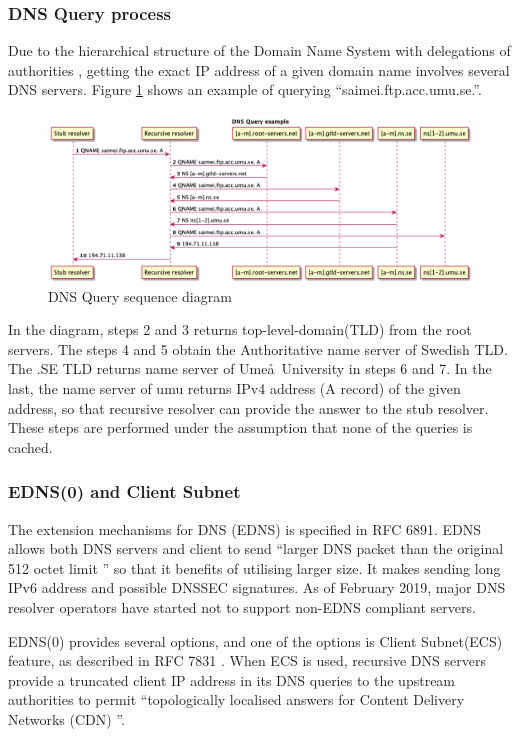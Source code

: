 \subsubsection{DNS Query process}
Due to the hierarchical structure of the Domain Name System with delegations of authorities \cite{rfc1591}, getting the exact IP address of a given domain name involves several DNS servers. Figure \ref{queryprocess} shows an example of querying ``saimei.ftp.acc.umu.se.''. 
\begin{figure}[ht!]
    \begin{center}
        \includegraphics*[width=\columnwidth]{img/dnsquery}
    \end{center}
    \caption{DNS Query sequence diagram}
    \label{queryprocess}
\end{figure}
In the diagram, steps 2 and 3 returns top-level-domain(TLD) from the root servers. The steps 4 and 5 obtain the Authoritative name server of Swedish TLD. The .SE TLD returns name server of Ume\aa\ University in steps 6 and 7. In the last, the name server of umu returns IPv4 address (A record) of the given address, so that recursive resolver can provide the answer to the stub resolver. These steps are performed under the assumption that none of the queries is cached. 
\subsubsection{EDNS(0) and Client Subnet}
The extension mechanisms for DNS (EDNS) is specified in RFC 6891. EDNS allows both DNS servers and client to send ``larger DNS packet than the original 512 octet limit \cite{rfc6891}'' so that it benefits of utilising larger size. It makes sending long IPv6 address and possible DNSSEC signatures. As of February 2019, major DNS resolver operators have started not to support non-EDNS compliant servers. 

EDNS(0) provides several options, and one of the options is Client Subnet(ECS) feature, as described in RFC 7831 \cite{rfc7871}. When ECS is used, recursive DNS servers provide a truncated client IP address in its DNS queries to the upstream authorities to permit ``topologically localised answers for Content Delivery Networks (CDN) \cite{kintis2016understanding}''.
